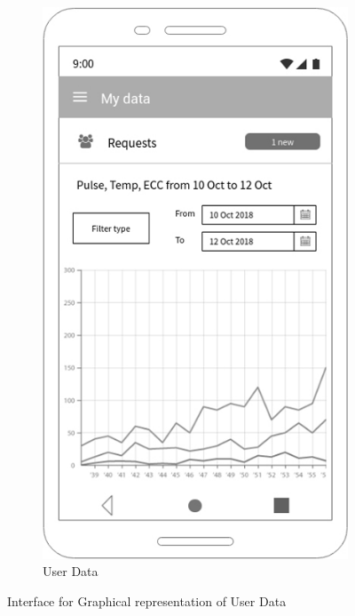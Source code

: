 \begin{figure}[h!]
\begin{subfigure}[b]{0.25\linewidth}
    \includegraphics[width=\linewidth]{img/mockup/u_data.jpg}

    \caption{User Data}

  \end{subfigure}

\caption{Interface for Graphical representation of User Data }

 \end{figure}



